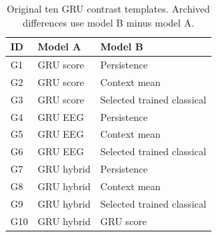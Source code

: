 \begin{table}[!ht]
\centering
\small
\setlength{\tabcolsep}{5pt}
\renewcommand{\arraystretch}{1.1}
\caption{Original ten GRU contrast templates. Archived differences use model B minus model A.}
\label{tab:supp_contrasts_gru}
\begin{tabular}{lll}
\toprule
ID & Model A & Model B \\
\midrule
G1 & GRU score & Persistence \\
G2 & GRU score & Context mean \\
G3 & GRU score & Selected trained classical \\
G4 & GRU EEG & Persistence \\
G5 & GRU EEG & Context mean \\
G6 & GRU EEG & Selected trained classical \\
G7 & GRU hybrid & Persistence \\
G8 & GRU hybrid & Context mean \\
G9 & GRU hybrid & Selected trained classical \\
G10 & GRU hybrid & GRU score \\
\bottomrule
\end{tabular}
\end{table}
